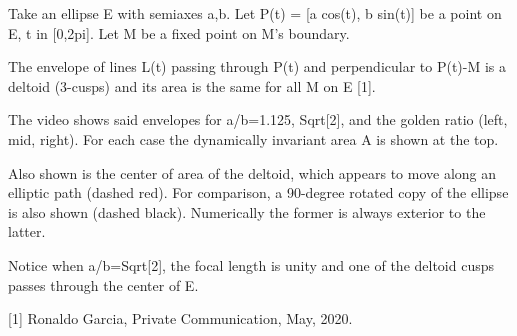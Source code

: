 Take an ellipse E with semiaxes a,b. Let P(t) = [a cos(t), b sin(t)] be a point on E, t in [0,2pi]. Let M be a fixed point on M's boundary.

The envelope of lines L(t) passing through P(t) and perpendicular to P(t)-M is a deltoid (3-cusps) and its area is the same for all M on E [1].

The video shows said envelopes for a/b=1.125, Sqrt[2], and the golden ratio (left, mid, right). For each case the dynamically invariant area A is shown at the top.

Also shown is the center of area of the deltoid, which appears to move along an elliptic path (dashed red). For comparison, a 90-degree rotated copy of the ellipse is also shown (dashed black). Numerically the former is always exterior to the latter.

Notice when a/b=Sqrt[2], the focal length is unity and one of the deltoid cusps passes through the center of E.

[1] Ronaldo Garcia, Private Communication, May, 2020.